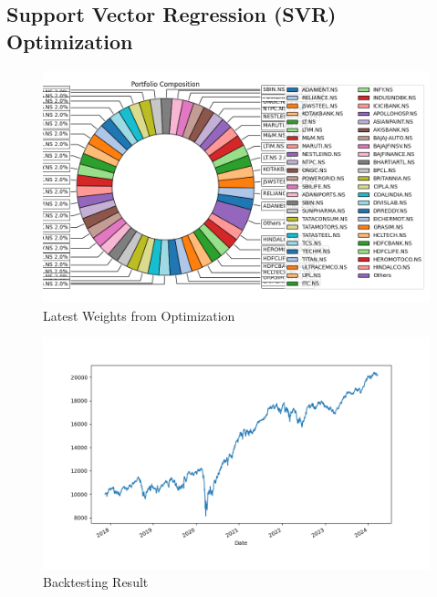 \subsection{Support Vector Regression (SVR) Optimization}

\begin{figure}[H]
   \centering
   \includegraphics[width=1\linewidth]{images/SVM/Weights.png}
   \caption{Latest Weights from Optimization}
   \label{fig:network_architecture1}
 \end{figure}

 \begin{figure}[H]
   \centering
   \includegraphics[width=1\linewidth]{images/SVM/backtest.png}
   \caption{Backtesting Result}
   \label{fig:network_architecture1}
 \end{figure}

